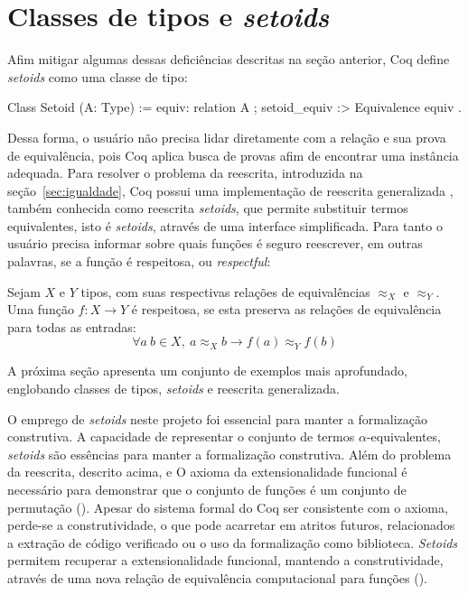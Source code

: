 \section{Classes de tipos e \textit{setoids}}\label{sec:classes-setoids}
Afim mitigar algumas dessas deficiências descritas na seção anterior, Coq define \textit{setoids} como uma classe de tipo:
\begin{coqcode}
Class Setoid (A: Type) := {
   equiv: relation A ;
   setoid_equiv :> Equivalence equiv 
}.
\end{coqcode}
Dessa forma, o usuário não precisa lidar diretamente com a relação e sua prova de equivalência, pois Coq aplica busca de provas afim de encontrar uma instância  adequada. Para resolver o problema da reescrita, introduzida na seção~\ref{sec:igualdade}, Coq possui uma implementação de reescrita generalizada \cite{Sozeau2009}, também conhecida como reescrita \textit{setoids}, que permite substituir termos equivalentes, isto é \textit{setoids}, através de uma interface simplificada. Para tanto o usuário precisa informar sobre quais funções é seguro reescrever, em outras palavras, se a função é respeitosa, ou \textit{respectful}:
\begin{definicao}\label{def:respeitosa}
	Sejam $X$ e $Y$ tipos, com suas respectivas relações de equivalências $\approx_X$ e $\approx_Y$. Uma função $f: X \rightarrow Y$ é respeitosa, se esta preserva as relações de equivalência para todas as entradas:
	\begin{equation*}
		\forall a~b \in X,~a \approx_X b \rightarrow f(a) \approx_Y f(b)
	\end{equation*}
\end{definicao}\noindent
A próxima seção apresenta um conjunto de exemplos mais aprofundado, englobando classes de tipos, \textit{setoids} e reescrita generalizada.


O emprego de \textit{setoids} neste projeto foi essencial para manter a formalização construtiva.
A capacidade de representar o conjunto de termos $\alpha$-equivalentes, \textit{setoids} são essências para manter a formalização construtiva.
Além do problema da reescrita, descrito acima, e  O axioma da extensionalidade funcional é necessário para demonstrar que o conjunto de funções é um conjunto de permutação (). Apesar do sistema formal do Coq ser consistente com o axioma, perde-se a construtividade, o que pode acarretar em atritos futuros, relacionados a extração de código verificado ou o uso da formalização como biblioteca. \textit{Setoids} permitem recuperar a extensionalidade funcional, mantendo a construtividade, através de uma nova relação de equivalência computacional para funções ().





